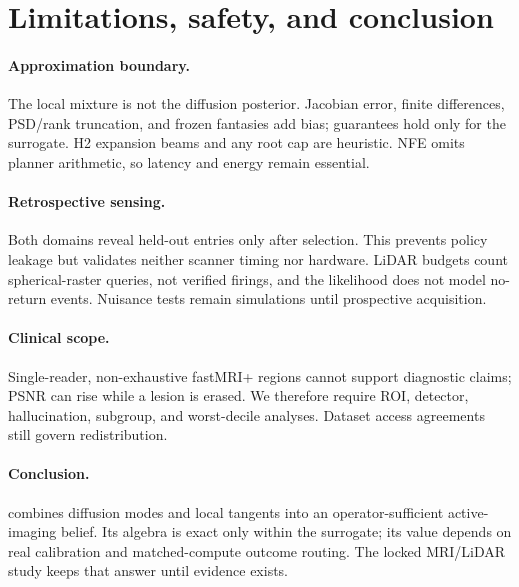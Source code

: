\section{Limitations, safety, and conclusion}
\label{sec:limitations}

\paragraph{Approximation boundary.}
The local mixture is not the diffusion posterior.  Jacobian error, finite
differences, PSD/rank truncation, and frozen fantasies add bias; guarantees
hold only for the surrogate.  H2 expansion beams and any root cap are
heuristic.  NFE omits planner arithmetic, so latency and energy remain
essential.

\paragraph{Retrospective sensing.}
Both domains reveal held-out entries only after selection.  This prevents
policy leakage but validates neither scanner timing nor hardware.  LiDAR
budgets count spherical-raster queries, not verified firings, and the
likelihood does not model no-return events.  Nuisance tests remain simulations
until prospective acquisition.

\paragraph{Clinical scope.}
Single-reader, non-exhaustive fastMRI+ regions cannot support diagnostic
claims; PSNR can rise while a lesion is erased.  We therefore require ROI,
detector, hallucination, subgroup, and worst-decile analyses.  Dataset access
agreements still govern redistribution.

\paragraph{Conclusion.}
\method{} combines diffusion modes and local tangents into an
operator-sufficient active-imaging belief.  Its algebra is exact only within
the surrogate; its value depends on real calibration and matched-compute
outcome routing.  The locked MRI/LiDAR study keeps that answer \pending{}
until evidence exists.
